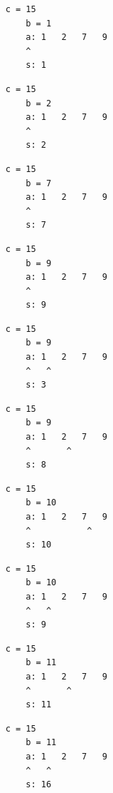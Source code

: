 { \begin{verbatim}
    c = 15
        b = 1
        a: 1   2   7   9
        ^
        s: 1
        \end{verbatim} }

{ \begin{verbatim}
    c = 15
        b = 2
        a: 1   2   7   9
        ^
        s: 2
        \end{verbatim} }

{ \begin{verbatim}
    c = 15
        b = 7
        a: 1   2   7   9
        ^
        s: 7
        \end{verbatim} }

{ \begin{verbatim}
    c = 15
        b = 9
        a: 1   2   7   9
        ^
        s: 9
        \end{verbatim} }

{ \begin{verbatim}
    c = 15
        b = 9
        a: 1   2   7   9
        ^   ^            
        s: 3
        \end{verbatim} }

{ \begin{verbatim}
    c = 15
        b = 9
        a: 1   2   7   9
        ^       ^        
        s: 8
        \end{verbatim} }

{ \begin{verbatim}
    c = 15
        b = 10
        a: 1   2   7   9
        ^           ^    
        s: 10
        \end{verbatim} }

{ \begin{verbatim}
    c = 15
        b = 10
        a: 1   2   7   9
        ^   ^        
        s: 9
        \end{verbatim} }

{ \begin{verbatim}
    c = 15
        b = 11
        a: 1   2   7   9
        ^       ^    
        s: 11
        \end{verbatim} }

{ \begin{verbatim}
    c = 15
        b = 11
        a: 1   2   7   9
        ^   ^    
        s: 16
        \end{verbatim} }

